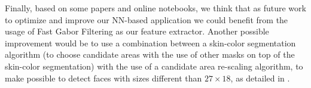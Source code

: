 Finally, based on some papers and online notebooks, we think that as future work to optimize and improve our NN-based application we could benefit from the usage of Fast Gabor Filtering as our feature extractor. Another possible improvement would be to use a combination between a skin-color segmentation algorithm (to choose candidate areas with the use of other masks on top of the skin-color segmentation) with the use of a candidate area re-scaling algorithm, to make possible to detect faces with sizes different than \(27 \times  18\), as detailed in \cite{5076875}.